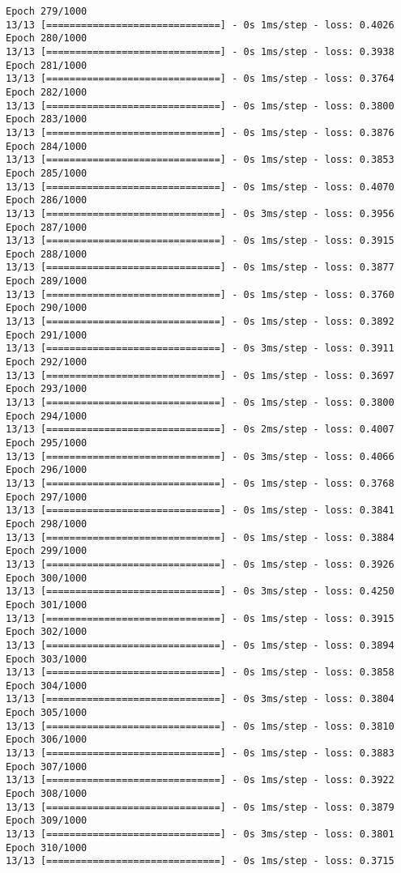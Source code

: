 \documentclass[11pt]{article}
\begin{document}
\begin{Verbatim}[commandchars=\\\{\}]
Epoch 279/1000
13/13 [==============================] - 0s 1ms/step - loss: 0.4026
Epoch 280/1000
13/13 [==============================] - 0s 1ms/step - loss: 0.3938
Epoch 281/1000
13/13 [==============================] - 0s 1ms/step - loss: 0.3764
Epoch 282/1000
13/13 [==============================] - 0s 1ms/step - loss: 0.3800
Epoch 283/1000
13/13 [==============================] - 0s 1ms/step - loss: 0.3876
Epoch 284/1000
13/13 [==============================] - 0s 1ms/step - loss: 0.3853
Epoch 285/1000
13/13 [==============================] - 0s 1ms/step - loss: 0.4070
Epoch 286/1000
13/13 [==============================] - 0s 3ms/step - loss: 0.3956
Epoch 287/1000
13/13 [==============================] - 0s 1ms/step - loss: 0.3915
Epoch 288/1000
13/13 [==============================] - 0s 1ms/step - loss: 0.3877
Epoch 289/1000
13/13 [==============================] - 0s 1ms/step - loss: 0.3760
Epoch 290/1000
13/13 [==============================] - 0s 1ms/step - loss: 0.3892
Epoch 291/1000
13/13 [==============================] - 0s 3ms/step - loss: 0.3911
Epoch 292/1000
13/13 [==============================] - 0s 1ms/step - loss: 0.3697
Epoch 293/1000
13/13 [==============================] - 0s 1ms/step - loss: 0.3800
Epoch 294/1000
13/13 [==============================] - 0s 2ms/step - loss: 0.4007
Epoch 295/1000
13/13 [==============================] - 0s 3ms/step - loss: 0.4066
Epoch 296/1000
13/13 [==============================] - 0s 1ms/step - loss: 0.3768
Epoch 297/1000
13/13 [==============================] - 0s 1ms/step - loss: 0.3841
Epoch 298/1000
13/13 [==============================] - 0s 1ms/step - loss: 0.3884
Epoch 299/1000
13/13 [==============================] - 0s 1ms/step - loss: 0.3926
Epoch 300/1000
13/13 [==============================] - 0s 3ms/step - loss: 0.4250
Epoch 301/1000
13/13 [==============================] - 0s 1ms/step - loss: 0.3915
Epoch 302/1000
13/13 [==============================] - 0s 1ms/step - loss: 0.3894
Epoch 303/1000
13/13 [==============================] - 0s 1ms/step - loss: 0.3858
Epoch 304/1000
13/13 [==============================] - 0s 3ms/step - loss: 0.3804
Epoch 305/1000
13/13 [==============================] - 0s 1ms/step - loss: 0.3810
Epoch 306/1000
13/13 [==============================] - 0s 1ms/step - loss: 0.3883
Epoch 307/1000
13/13 [==============================] - 0s 1ms/step - loss: 0.3922
Epoch 308/1000
13/13 [==============================] - 0s 1ms/step - loss: 0.3879
Epoch 309/1000
13/13 [==============================] - 0s 3ms/step - loss: 0.3801
Epoch 310/1000
13/13 [==============================] - 0s 1ms/step - loss: 0.3715

\end{Verbatim}
\end{document}
